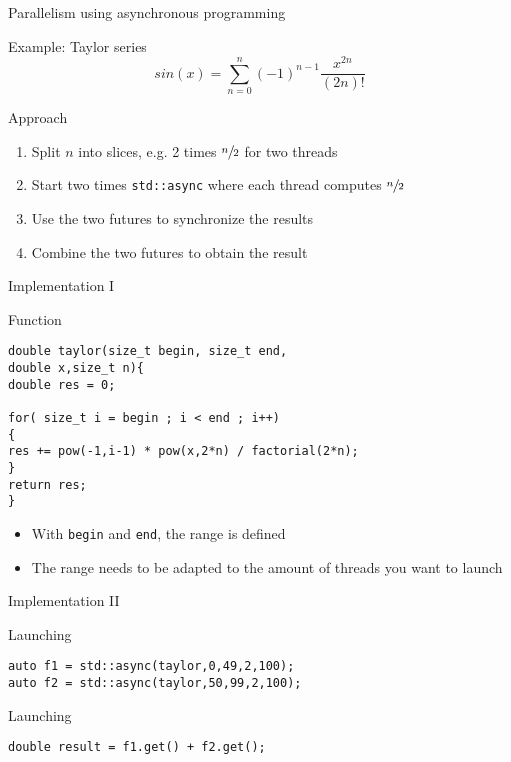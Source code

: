 \documentclass[12pt,t]{beamer}
\begin{document}
\begin{frame}{Parallelism using asynchronous programming}

\begin{block}{Example: Taylor series}
$$
sin(x) = \sum\limits_{n=0}^n (-1)^{n-1} \frac{x^{2n}}{(2n)!} 
$$
\end{block}

\begin{block}{Approach}
\begin{enumerate}
\item Split $n$ into slices, e.g. 2 times $\sfrac{n}{2}$ for two threads
\item Start two times \lstinline|std::async| where each thread computes $\sfrac{n}{2}$
\item Use the two futures to synchronize the results
\item Combine the two futures to obtain the result
\end{enumerate}
\end{block}

\end{frame}

\begin{frame}[fragile]{Implementation I}

\begin{block}{Function}
\begin{lstlisting}
double taylor(size_t begin, size_t end, 
double x,size_t n){
double res = 0;

for( size_t i = begin ; i < end ; i++)
{
res += pow(-1,i-1) * pow(x,2*n) / factorial(2*n);
} 
return res;
}

\end{lstlisting}
\end{block}

\begin{itemize}
\item With \lstinline|begin| and \lstinline|end|, the range is defined
\item The range needs to be adapted to the amount of threads you want to launch
\end{itemize}
\end{frame}

\begin{frame}[fragile]{Implementation II}

\begin{block}{Launching}
\begin{lstlisting}
auto f1 = std::async(taylor,0,49,2,100); 
auto f2 = std::async(taylor,50,99,2,100); 
\end{lstlisting}
\end{block}

\begin{block}{Launching}
\begin{lstlisting}
double result = f1.get() + f2.get();
\end{lstlisting}
\end{block}
\end{frame}
\end{document}

